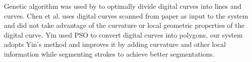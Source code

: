 \documentclass{article}%
\begin{document}
Genetic algorithm was used by \cite{CruveDivisionSwarm} to optimally divide digital curves into lines and curves. Chen et al. uses digital curves scanned from paper as input to the system and did not take advantage of the curvature or local geometric properties of the digital curve. Yin \cite{PolygonApproximationPSO} used PSO to convert digital curves into polygons, our system adopts Yin's method and improves it by adding curvature and other local information while segmenting strokes to achieve better segmentations.%
\end{document}
